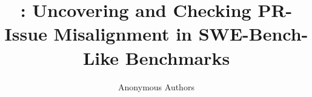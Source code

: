 \documentclass[sigconf, review, anonymous]{acmart}
\title{\tool: Uncovering and Checking PR-Issue Misalignment
in SWE-Bench-Like Benchmarks}
\author{Anonymous Authors}
\newcommand{\tool}{\textsc{PaiChecker}\xspace}
\begin{document}
    \begin{abstract}


\end{abstract}
\end{document}
